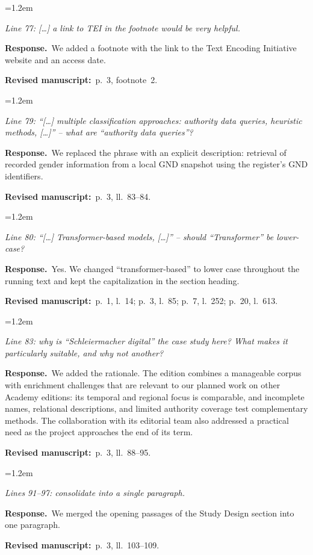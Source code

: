 \documentclass[11pt,a4paper]{article}
\newenvironment{reviewercomment}
  {\par\smallskip\begin{list}{}{\leftmargin=1.2em\rightmargin=0pt}\item[]\color{black!75}\itshape}
  {\end{list}\smallskip}
\newcommand{\response}{\par\noindent\textbf{Response.}~}
\newcommand{\where}[1]{\par\noindent\textbf{Revised manuscript:}~#1\par\medskip}
\begin{document}
\begin{enumerate}[label=\textbf{I\arabic*}, leftmargin=2.2em, itemsep=0.8em]
\item
\begin{reviewercomment}
Line 77: [\dots] a link to TEI in the footnote would be very helpful.
\end{reviewercomment}
\response We added a footnote with the link to the Text Encoding Initiative website and an access date.
\where{p.~3, footnote~2.}

\item
\begin{reviewercomment}
Line 79: ``[\dots] multiple classification approaches: authority data queries, heuristic methods,
[\dots]'' -- what are ``authority data queries''?
\end{reviewercomment}
\response We replaced the phrase with an explicit description: retrieval of recorded gender
information from a local GND snapshot using the register's GND identifiers.
\where{p.~3, ll.~83--84.}

\item
\begin{reviewercomment}
Line 80: ``[\dots] Transformer-based models, [\dots]'' -- should ``Transformer'' be lower-case?
\end{reviewercomment}
\response Yes. We changed ``transformer-based'' to lower case throughout the running text and kept the
capitalization in the section heading.
\where{p.~1, l.~14; p.~3, l.~85; p.~7, l.~252; p.~20, l.~613.}

\item
\begin{reviewercomment}
Line 83: why is ``Schleiermacher digital'' the case study here? What makes it particularly suitable,
and why not another?
\end{reviewercomment}
\response We added the rationale. The edition combines a manageable corpus with enrichment challenges
that are relevant to our planned work on other Academy editions: its temporal and regional focus is
comparable, and incomplete names, relational descriptions, and limited authority coverage test
complementary methods. The collaboration with its editorial team also addressed a practical need as
the project approaches the end of its term.
\where{p.~3, ll.~88--95.}

\item
\begin{reviewercomment}
Lines 91--97: consolidate into a single paragraph.
\end{reviewercomment}
\response We merged the opening passages of the Study Design section into one paragraph.
\where{p.~3, ll.~103--109.}


\end{enumerate}
\end{document}

